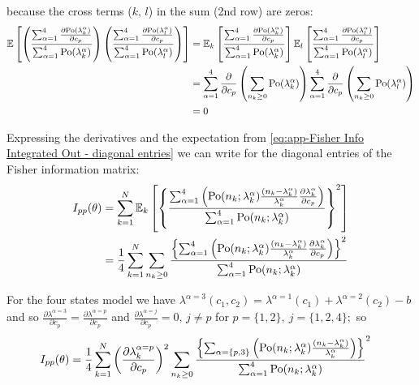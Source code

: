 %
because the cross terms ($k,\, l$) in the sum (2nd row) are zeros: 
%
\begin{alignat*}{1}
	\mathbb{E}\left[\left(\frac{\sum_{\alpha=1}^4\frac{\partial\mathrm{Po}(\lambda_k^\alpha)}{\partial c_p}}{\sum_{\alpha=1}^4\mathrm{Po}(\lambda_k^\alpha)}\right)\left(\frac{\sum_{\alpha=1}^4\frac{\partial\mathrm{Po}(\lambda_l^\alpha)}{\partial c_p}}{\sum_{\alpha=1}^4\mathrm{Po}(\lambda_l^\alpha)}\right)\right] 
	& =\mathbb{E}_k\left[\frac{\sum_{\alpha=1}^4\frac{\partial\mathrm{Po}(\lambda_k^\alpha)}{\partial c_p}}{\sum_{\alpha=1}^4\mathrm{Po}(\lambda_k^\alpha)}\right]\mathbb{E}_l\left[\frac{\sum_{\alpha=1}^4\frac{\partial\mathrm{Po}(\lambda_l^\alpha)}{\partial c_p}}{\sum_{\alpha=1}^4\mathrm{Po}(\lambda_l^\alpha)}\right]\\
 	& =\sum_{\alpha=1}^4\frac{\partial}{\partial c_p}\left(\sum_{n_k\geq0}\mathrm{Po}(\lambda_k^\alpha)\right)\sum_{\alpha=1}^4\frac{\partial}{\partial c_p}\left(\sum_{n_k\geq0}\mathrm{Po}(\lambda_l^\alpha)\right)\\
 	& =0
\end{alignat*}

Expressing the derivatives and the expectation from \autoref{eq:app-Fisher Info Integrated Out - diagonal entries} we can write for the diagonal entries of the Fisher information matrix:
%
\begin{alignat*}{1}
	I_{pp}(\theta) & =\sum_{k=1}^N\mathbb{E}_k\left[\left\{ \frac{\sum_{\alpha=1}^4\left(\mathrm{Po}(n_k;\lambda_k^\alpha)\frac{(n_k-\lambda_k^\alpha)}{\lambda_k^\alpha}\frac{\partial\lambda_k^\alpha}{\partial c_p}\right)}{\sum_{\alpha=1}^4\mathrm{Po}(n_k;\lambda_k^\alpha)}\right\} ^2\right]\\
 	& =\frac{1}{4}\sum_{k=1}^N\sum_{n_k\geq0}\frac{\left\{ \sum_{\alpha=1}^4\left(\mathrm{Po}(n_k;\lambda_k^\alpha)\frac{(n_k-\lambda_k^\alpha)}{\lambda_k^\alpha}\frac{\partial\lambda_k^\alpha}{\partial c_p}\right)\right\} ^2}{\sum_{\alpha=1}^4\mathrm{Po}(n_k;\lambda_k^\alpha)}
\end{alignat*}

For the four states model we have $\lambda^{\alpha=3}(c_1,c_2)=\lambda^{\alpha=1}(c_1)+\lambda^{\alpha=2}(c_2)-b$ and so $\frac{\partial\lambda^{\alpha=3}}{\partial c_p}=\frac{\partial\lambda^{\alpha=p}}{\partial c_p}$ and $\frac{\partial\lambda^{\alpha=j}}{\partial c_p}=0,\, j\neq p$ for $p=\{1,2\},\: j=\{1,2,4\};$ so 
%
\begin{alignat*}{1}
	I_{pp}(\theta) & =\frac{1}{4}\sum_{k=1}^N\left(\frac{\partial\lambda_k^{\alpha=p}}{\partial c_p}\right)^2\sum_{n_k\geq0}\frac{\left\{\sum_{\alpha=\{p,3\}}\left(\mathrm{Po}(n_k;\lambda_k^\alpha)\frac{(n_k-\lambda_k^\alpha)}{\lambda_k^\alpha}\right)\right\}}{\sum_{\alpha=1}^4\mathrm{Po}(n_k;\lambda_k^\alpha)} ^2
\end{alignat*}


